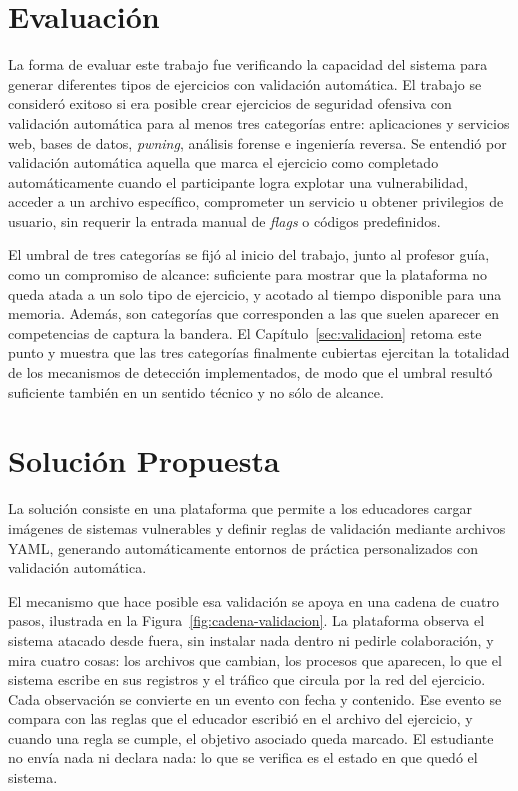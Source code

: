 \section{Evaluación}

La forma de evaluar este trabajo fue verificando la capacidad del sistema para
generar diferentes tipos de ejercicios con validación automática. El trabajo se
consideró exitoso si era posible crear ejercicios de seguridad ofensiva con
validación automática para al menos tres categorías entre: aplicaciones y
servicios web, bases de datos, \textit{pwning}, análisis forense e ingeniería
reversa. Se entendió por validación automática aquella que marca el ejercicio
como completado automáticamente cuando el participante logra explotar una
vulnerabilidad, acceder a un archivo específico, comprometer un servicio u
obtener privilegios de usuario, sin requerir la entrada manual de \textit{flags}
o códigos predefinidos.

El umbral de tres categorías se fijó al inicio del trabajo, junto al profesor
guía, como un compromiso de alcance: suficiente para mostrar que la plataforma
no queda atada a un solo tipo de ejercicio, y acotado al tiempo disponible para
una memoria. Además, son categorías que corresponden a las que suelen
aparecer en competencias de captura la bandera. El
Capítulo~\ref{sec:validacion} retoma este punto y muestra que las tres
categorías finalmente cubiertas ejercitan la totalidad de los mecanismos de
detección implementados, de modo que el umbral resultó suficiente también en un
sentido técnico y no sólo de alcance.

\section{Solución Propuesta}

La solución consiste en una plataforma que permite a los educadores cargar
imágenes de sistemas vulnerables y definir reglas de validación mediante
archivos YAML, generando automáticamente entornos de práctica personalizados con
validación automática.

El mecanismo que hace posible esa validación se apoya en una cadena de cuatro
pasos, ilustrada en la Figura~\ref{fig:cadena-validacion}. La plataforma observa
el sistema atacado desde fuera, sin instalar nada dentro ni pedirle
colaboración, y mira cuatro cosas: los archivos que cambian, los procesos que
aparecen, lo que el sistema escribe en sus registros y el tráfico que circula
por la red del ejercicio. Cada observación se convierte en un evento con
fecha y contenido. Ese evento se compara con las reglas que el educador escribió
en el archivo del ejercicio, y cuando una regla se cumple, el objetivo asociado
queda marcado. El estudiante no envía nada ni declara nada: lo que se verifica
es el estado en que quedó el sistema.


